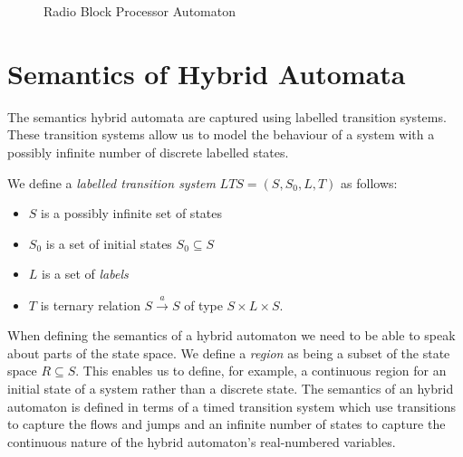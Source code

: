 \begin{figure} [H]
\begin{center}
\begin{tikzpicture}[node distance = 1cm]
\end{tikzpicture} 
\end{center}
\caption{Radio Block Processor Automaton}
\label{fig:RBCAuton}
\end{figure}



\section{Semantics of Hybrid Automata} \label{sec:hyseman}

The semantics hybrid automata are captured using labelled transition systems. These transition systems allow us to model the behaviour of a system with a possibly infinite number of discrete labelled states. 
\medskip
\begin{mydef}
We define a \emph{labelled transition system} $LTS = (S,S_0,L,T)$ as follows:
\begin{itemize}

\item $S$ is a possibly infinite set of states

\item $S_0$ is a set of initial states $S_0 \subseteq S$

\item $L$ is a set of \emph{labels}

\item $T$ is ternary  relation $S \xrightarrow{a} S$ of type $S \times L \times S$.

\end{itemize}
\end{mydef}
\medskip
When defining the semantics of a hybrid automaton we need to be able to speak about parts of the state space.  We define a \emph{region} as being a subset of the state space $R \subseteq S$.  This enables us to define, for example, a continuous region for an initial state of a system rather than a discrete state. The semantics of an hybrid automaton \cite{TH96} is defined in terms of a timed transition system which use transitions to capture the flows and jumps and an infinite number of states to capture the continuous nature of the hybrid automaton's real-numbered variables.

